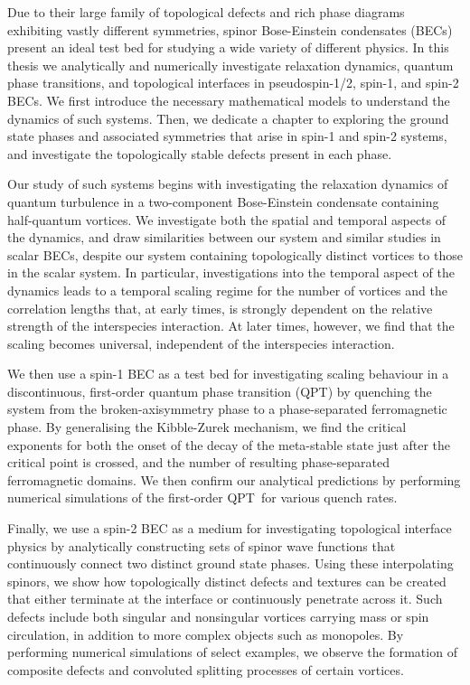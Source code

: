 Due to their large family of topological defects and rich phase diagrams
exhibiting vastly different symmetries, spinor Bose-Einstein condensates (BECs)
present an ideal test bed for studying a wide variety of different physics.
In this thesis we analytically and numerically investigate relaxation dynamics,
quantum phase transitions, and topological interfaces in pseudospin-1/2, spin-1,
and spin-2 BECs.
We first introduce the necessary mathematical models to understand the dynamics
of such systems.
Then, we dedicate a chapter to exploring the ground state phases and associated
symmetries that arise in spin-1 and spin-2 systems, and investigate the
topologically stable defects present in each phase.

Our study of such systems begins with investigating the relaxation dynamics of
quantum turbulence in a two-component Bose-Einstein condensate containing
half-quantum vortices.
We investigate both the spatial and temporal aspects of the dynamics, and draw
similarities between our system and similar studies in scalar BECs, despite our
system containing topologically distinct vortices to those in the scalar system.
In particular, investigations into the temporal aspect of the dynamics leads to
a temporal scaling regime for the number of vortices and the correlation
lengths that, at early times, is strongly dependent on the relative strength of
the interspecies interaction. At later times, however, we find that the scaling
becomes universal, independent of the interspecies interaction.

We then use a spin-1 BEC as a test bed for investigating scaling behaviour in a
discontinuous, first-order quantum phase transition (QPT) by quenching the
system from the broken-axisymmetry phase to a phase-separated ferromagnetic
phase.
By generalising the Kibble-Zurek mechanism, we find the critical exponents for
both the onset of the decay of the meta-stable state just after the critical
point is crossed, and the number of resulting phase-separated ferromagnetic
domains.
We then confirm our analytical predictions by performing numerical
simulations of the first-order QPT\ for various quench rates.

Finally, we use a spin-2 BEC as a medium for investigating topological interface
physics by analytically constructing sets of spinor wave functions that
continuously connect two distinct ground state phases.
Using these interpolating spinors, we show how topologically distinct defects
and textures can be created that either terminate at the interface or
continuously penetrate across it.
Such defects include both singular and nonsingular vortices carrying mass or
spin circulation, in addition to more complex objects such as monopoles.
By performing numerical simulations of select examples, we observe the
formation of composite defects and convoluted splitting processes of certain
vortices.

